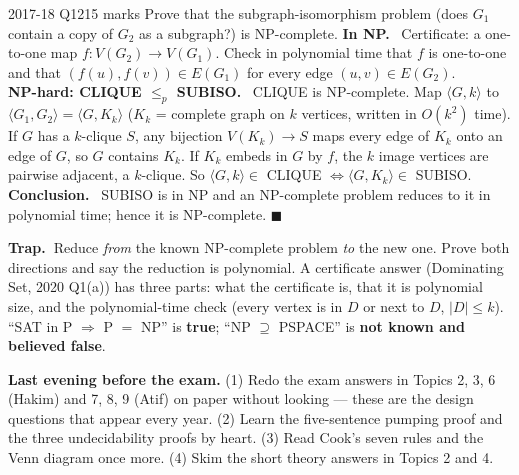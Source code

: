 \documentclass[10.5pt,a4paper]{article}
\newcommand{\TRAP}{\textbf{\color{trapborder}Trap.\ }}
\newcommand{\ansh}[1]{\textbf{\color{exborder}#1}\ }
\begin{document}
\begin{examq}{2017-18 Q12}{15 marks}
Prove that the subgraph-isomorphism problem (does $G_1$ contain a copy of $G_2$ as a subgraph?) is NP-complete.
\tcblower
\ansh{In NP.} Certificate: a one-to-one map $f:V(G_2)\to V(G_1)$. Check in polynomial time that $f$ is one-to-one and that
$(f(u),f(v))\in E(G_1)$ for every edge $(u,v)\in E(G_2)$.\\
\ansh{NP-hard: CLIQUE $\le_p$ SUBISO.} CLIQUE is NP-complete. Map $\langle G,k\rangle$ to $\langle G_1,G_2\rangle=\langle G,K_k\rangle$ ($K_k$ =
complete graph on $k$ vertices, written in $O(k^2)$ time). If $G$ has a $k$-clique $S$, any bijection $V(K_k)\to S$ maps every edge of $K_k$
onto an edge of $G$, so $G$ contains $K_k$. If $K_k$ embeds in $G$ by $f$, the $k$ image vertices are pairwise adjacent, a $k$-clique. So
$\langle G,k\rangle\in$ CLIQUE $\iff\langle G,K_k\rangle\in$ SUBISO.\\
\ansh{Conclusion.} SUBISO is in NP and an NP-complete problem reduces to it in polynomial time; hence it is NP-complete. $\blacksquare$
\end{examq}

\begin{trap}\TRAP Reduce \emph{from} the known NP-complete problem \emph{to} the new one. Prove both directions and say the reduction is polynomial.
A certificate answer (Dominating Set, 2020 Q1(a)) has three parts: what the certificate is, that it is polynomial size, and the polynomial-time
check (every vertex is in $D$ or next to $D$, $|D|\le k$). ``SAT in P $\Rightarrow$ P $=$ NP'' is \textbf{true}; ``NP $\supseteq$ PSPACE'' is
\textbf{not known and believed false}.\end{trap}

\begin{tcolorbox}[colback=white,colframe=navy,boxrule=0.4pt,arc=1pt,left=6pt,right=6pt,top=3pt,bottom=3pt]
\textbf{Last evening before the exam.} (1) Redo the exam answers in Topics 2, 3, 6 (Hakim) and 7, 8, 9 (Atif) on paper without looking ---
these are the design questions that appear every year. (2) Learn the five-sentence pumping proof and the three undecidability proofs by heart.
(3) Read Cook's seven rules and the Venn diagram once more. (4) Skim the short theory answers in Topics 2 and 4.
\end{tcolorbox}
\end{document}
